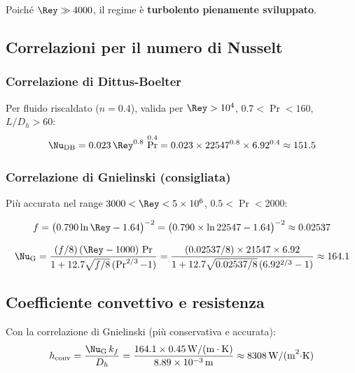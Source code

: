 \documentclass[a4paper,11pt]{article}
\begin{document}
Poiché $\Rey \gg 4000$, il regime è \textbf{turbolento pienamente sviluppato}.

\subsection{Correlazioni per il numero di Nusselt}

\subsubsection{Correlazione di Dittus-Boelter}

Per fluido riscaldato ($n=0.4$), valida per $\Rey > 10^4$, $0.7 < \Pr < 160$,
$L/D_h > 60$:
\begin{equation}
  \Nu_{\mathrm{DB}} = 0.023\,\Rey^{0.8}\,\Pr^{0.4}
                    = 0.023 \times 22547^{0.8} \times 6.92^{0.4}
                    \approx 151.5
\end{equation}

\subsubsection{Correlazione di Gnielinski (consigliata)}

Più accurata nel range $3000 < \Rey < 5\times10^6$, $0.5 < \Pr < 2000$:

\begin{equation}
  f = \bigl(0.790\ln\Rey - 1.64\bigr)^{-2}
    = \bigl(0.790\times\ln 22547 - 1.64\bigr)^{-2}
    \approx 0.02537
\end{equation}

\begin{equation}
  \Nu_{\mathrm{G}} = \frac{(f/8)\,(\Rey-1000)\,\Pr}
                         {1 + 12.7\sqrt{f/8}\,(\Pr^{2/3}-1)}
                  = \frac{(0.02537/8)\times 21547 \times 6.92}
                         {1 + 12.7\sqrt{0.02537/8}\,(6.92^{2/3}-1)}
                  \approx 164.1
\end{equation}

\subsection{Coefficiente convettivo e resistenza}

Con la correlazione di Gnielinski (più conservativa e accurata):
\begin{equation}
  h_{\mathrm{conv}} = \frac{\Nu_{\mathrm{G}}\,k_f}{D_h}
                    = \frac{164.1 \times \SI{0.45}{W/(m\cdot K)}}{\SI{8.89e-3}{m}}
                    \approx \SI{8308}{W/(m^2\cdot K)}
\end{equation}
\end{document}
